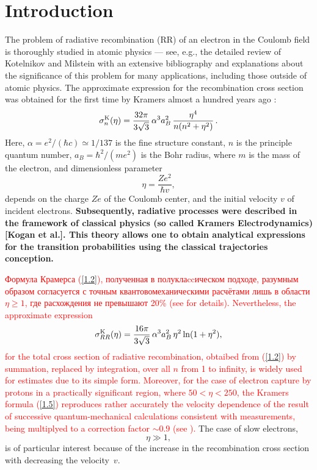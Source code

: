 \documentclass{SovJurn/JETPL}
\begin{document}
\section{Introduction}
The problem of radiative recombination (RR) of an electron in the Coulomb field is thoroughly studied in atomic physics --- see, e.g., the detailed review of Kotelnikov and Milstein \cite{kotelnikov2019electron} with an extensive bibliography and explanations about the significance of this problem for many applications, including those outside of atomic physics. The approximate expression for the recombination cross section was obtained for the first time by Kramers almost a hundred years ago \cite{kramers1923xciii}:
\begin{equation}
\label{1.2}
\sigma^{\rm K}_{n}(\eta)=\frac{32\pi}{3\sqrt{3}}\,\alpha^3a_B^2\,\frac{\eta^4}{n(n^2+\eta^2)}\,.
\end{equation}
Here, $\alpha=e^2/(\hbar c)\simeq 1/137$ is the fine structure constant, $n$ is the principle quantum number, $a_B=\hbar^2/(me^2)$ is the Bohr radius, where $m$ is the mass of the electron, and dimensionless parameter
\begin{equation}
\eta=\frac{Ze^2}{\hbar v},
\label{eta}
\end{equation}
\newline
depends on the charge  $Ze$ of the Coulomb center, and the initial velocity $v$ of incident electrons.
\textbf{Subsequently, radiative processes were described in the framework of classical physics (so called Kramers Electrodynamics) [Kogan et al.]. This theory allows one to obtain analytical expressions for the transition probabilities using the classical trajectories conception.} 
\par \textcolor{Red}{Формула Крамерса (\ref{1.2}), полученная в полуклаccическом подходе, разумным образом согласуется с точным квантовомеханическими  расчётами лишь в области $\eta\ge 1$, где расхождения не превышают 20\% (see \cite{kotelnikov2019electron} for details). Nevertheless, the approximate expression
\begin{equation}
\label{1.5}
\sigma^{\rm K}_{RR}(\eta)=\frac{16\pi}{3\sqrt{3}}\,\alpha^3a_B^2\,\eta^2\ln (1+\eta^2),
\end{equation}
for the total cross section of radiative recombination, obtaibed from (\ref{1.2}) by summation, replaced by integration, over all $n$ from 1 to infinity, is widely used for estimates due to its simple form. Moreover, for the case of electron capture by protons in a practically significant region, where $50 <\eta <250$, the Kramers formula (\ref{1.5}) reproduces rather accurately the velocity dependence of the result of successive quantum-mechanical calculations consistent with measurements, being multiplyed to a correction factor $\sim 0.9$ (see \cite{kotelnikov2019electron}).} The case of slow electrons,
\begin{equation}
\eta\gg 1,
\label{low_speed_relation}
\end{equation}
is of particular interest because of the increase in the recombination cross section with decreasing the velocity~$v$.
\end{document}
